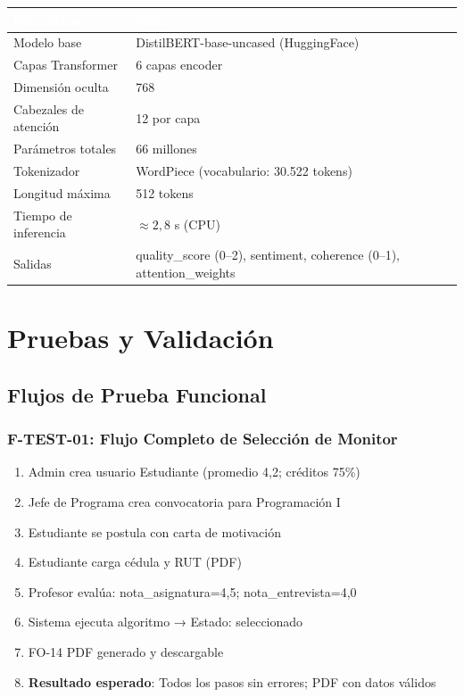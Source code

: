\documentclass[12pt,a4paper,twoside]{report}
\begin{document}
\begin{center}
\begin{tabularx}{\textwidth}{|l|X|}
\hline
\rowcolor{tableHdr}\textcolor{white}{\textbf{Parámetro}} & \textcolor{white}{\textbf{Valor}} \\
\hline
\rowcolor{rowOdd}Modelo base & DistilBERT-base-uncased (HuggingFace) \\
\hline\rowcolor{rowEven}Capas Transformer & 6 capas encoder \\
\hline\rowcolor{rowOdd}Dimensión oculta & 768 \\
\hline\rowcolor{rowEven}Cabezales de atención & 12 por capa \\
\hline\rowcolor{rowOdd}Parámetros totales & 66 millones \\
\hline\rowcolor{rowEven}Tokenizador & WordPiece (vocabulario: 30.522 tokens) \\
\hline\rowcolor{rowOdd}Longitud máxima & 512 tokens \\
\hline\rowcolor{rowEven}Tiempo de inferencia & $\approx 2{,}8$ s (CPU) \\
\hline\rowcolor{rowOdd}Salidas & quality\_score (0--2), sentiment, coherence (0--1), attention\_weights \\
\hline
\end{tabularx}
\end{center}

\chapter{Pruebas y Validación}

\section{Flujos de Prueba Funcional}

\subsection{F-TEST-01: Flujo Completo de Selección de Monitor}
\begin{enumerate}[leftmargin=*]
\item Admin crea usuario Estudiante (promedio 4,2; créditos 75\%)
\item Jefe de Programa crea convocatoria para Programación I
\item Estudiante se postula con carta de motivación
\item Estudiante carga cédula y RUT (PDF)
\item Profesor evalúa: nota\_asignatura=4,5; nota\_entrevista=4,0
\item Sistema ejecuta algoritmo → Estado: seleccionado
\item FO-14 PDF generado y descargable
\item \textbf{Resultado esperado}: Todos los pasos sin errores; PDF con datos válidos
\end{enumerate}
\end{document}
